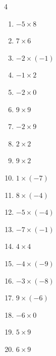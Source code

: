 \begin{multicols}{4}
\begin{enumerate}
  \item $-5\times 8$
        \phantom{$=-40$}

  \item $7\times 6$
        \phantom{$=42$}

  \item $-2\times (-1)$
        \phantom{$=2$}

  \item $-1\times 2$
        \phantom{$=-2$}

  \item $-2\times 0$
        \phantom{$=0$}

  \item $9\times 9$
        \phantom{$=81$}

\columnbreak %

\resetques

  \item $-2\times 9$
        \phantom{$=-18$}

  \item $2\times 2$
        \phantom{$=4$}

  \item $9\times 2$
        \phantom{$=18$}

  \item $1\times (-7)$
        \phantom{$=-7$}

  \item $8\times (-4)$
        \phantom{$=-32$}

  \item $-5\times (-4)$
        \phantom{$=20$}

  \item $-7\times (-1)$
        \phantom{$=7$}

  \item $4\times 4$
        \phantom{$=16$}

  \item $-4\times (-9)$
        \phantom{$=36$}

  \item $-3\times (-8)$
        \phantom{$=24$}

  \item $9\times (-6)$
        \phantom{$=-54$}

  \item $-6\times 0$
        \phantom{$=0$}

  \item $5\times 9$
        \phantom{$=45$}

  \item $6\times 9$
        \phantom{$=54$}


\end{enumerate}
\end{multicols}
